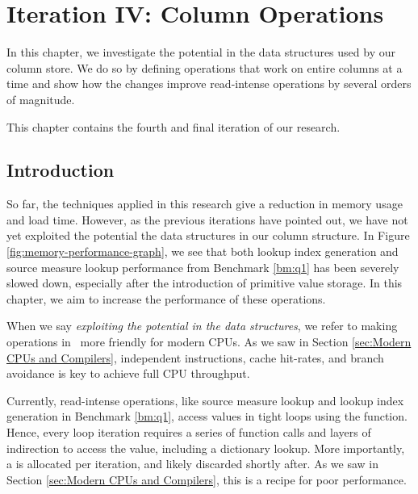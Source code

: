 \chapter{Iteration IV: Column Operations}
\label{chap:operations}

In this chapter, we investigate the potential in the data structures used by our column store. We do so by defining operations that work on entire columns at a time and show how the changes improve read-intense operations by several orders of magnitude.

This chapter contains the fourth and final iteration of our research.

\clearpage

\section{Introduction}
\label{sec:Introduction}


So far, the techniques applied in this research give a reduction in memory usage and load time. However, as the previous iterations have pointed out, we have not yet exploited the potential the data structures in our column structure. In Figure \ref{fig:memory-performance-graph}, we see that both lookup index generation and source measure lookup performance from Benchmark \ref{bm:q1} has been severely slowed down, especially after the introduction of primitive value storage. In this chapter, we aim to increase the performance of these operations.

When we say \textit{exploiting the potential in the data structures}, we refer to making operations in \gap~more friendly for modern CPUs. As we saw in Section \ref{sec:Modern CPUs and Compilers}, independent instructions, cache hit-rates, and branch avoidance is key to achieve full CPU throughput. 

Currently, read-intense operations, like source measure lookup and lookup index generation in Benchmark \ref{bm:q1}, access values in tight loops using the  function. Hence, every loop iteration requires a series of function calls and layers of indirection to access the value, including a dictionary lookup. More importantly, a  is allocated per iteration, and likely discarded shortly after. As we saw in Section \ref{sec:Modern CPUs and Compilers}, this is a recipe for poor performance.

